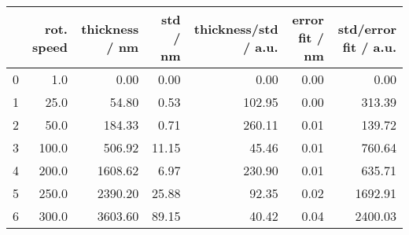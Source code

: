 \begin{tabular}{lrrrrrr}
\toprule
{} &  rot. speed &  thickness / nm &  std / nm &  thickness/std / a.u. &  error fit / nm &  std/error fit / a.u. \\
\midrule
0 &         1.0 &            0.00 &      0.00 &                  0.00 &            0.00 &                  0.00 \\
1 &        25.0 &           54.80 &      0.53 &                102.95 &            0.00 &                313.39 \\
2 &        50.0 &          184.33 &      0.71 &                260.11 &            0.01 &                139.72 \\
3 &       100.0 &          506.92 &     11.15 &                 45.46 &            0.01 &                760.64 \\
4 &       200.0 &         1608.62 &      6.97 &                230.90 &            0.01 &                635.71 \\
5 &       250.0 &         2390.20 &     25.88 &                 92.35 &            0.02 &               1692.91 \\
6 &       300.0 &         3603.60 &     89.15 &                 40.42 &            0.04 &               2400.03 \\
\bottomrule
\end{tabular}

